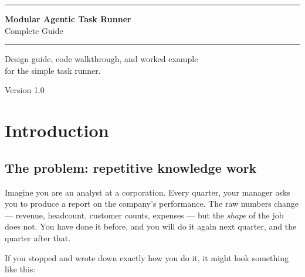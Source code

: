\documentclass[12pt, a4paper]{article}
\begin{document}
\begin{titlepage}
  \centering
  \vspace*{3cm}
  {\color{primary}\rule{\linewidth}{2pt}}
  \vspace{1cm}

  {\Huge\bfseries\color{darktext} Modular Agentic Task Runner}\\[0.5em]
  {\Large\color{mutedtext} Complete Guide}

  \vspace{1cm}
  {\color{primary}\rule{\linewidth}{2pt}}

  \vspace{2cm}
  {\large\color{mutedtext}
    Design guide, code walkthrough, and worked example\\
    for the simple task runner.
  }

  \vfill
  {\small\color{mutedtext} Version 1.0}
\end{titlepage}

\tableofcontents
\newpage

\section{Introduction}

\subsection{The problem: repetitive knowledge work}

Imagine you are an analyst at a corporation. Every quarter, your manager asks you to produce a report on the company's performance. The raw numbers change --- revenue, headcount, customer counts, expenses --- but the \textit{shape} of the job does not. You have done it before, and you will do it again next quarter, and the quarter after that.

If you stopped and wrote down exactly how you do it, it might look something like this:
\end{document}
